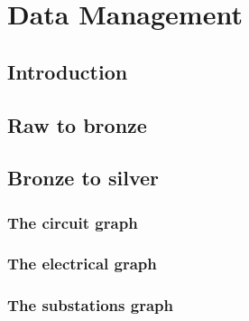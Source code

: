 \chapter{Data Management}

\section{Introduction}




\section{Raw to bronze}




\section{Bronze to silver}


\subsection{The circuit graph}



\subsection{The electrical graph}



\subsection{The substations graph}
